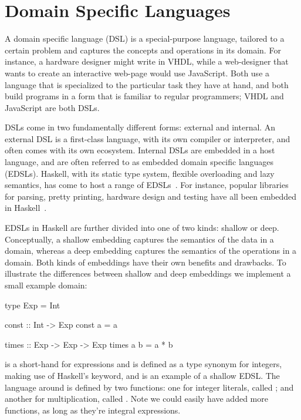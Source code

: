 \documentclass[../paper.tex]{subfiles}
\begin{document}
\section{Domain Specific Languages}
\label{domain}

A domain specific language (DSL) is a special-purpose language, tailored to a certain problem and captures the concepts and operations in its domain. For instance, a hardware designer might write in VHDL, while a web-designer that wants to create an interactive web-page would use JavaScript. Both use a language that is specialized to the particular task they have at hand, and both build programs in a form that is familiar to regular programmers; VHDL and JavaScript are both DSLs.

DSLs come in two fundamentally different forms: external and internal. An external DSL is a first-class language, with its own compiler or interpreter, and often comes with its own ecosystem. Internal DSLs are embedded in a host language, and are often referred to as embedded domain specific languages (EDSLs). Haskell, with its static type system, flexible overloading and lazy semantics, has come to host a range of EDSLs~\cite{elliott2003}. For instance, popular libraries for parsing, pretty printing, hardware design and testing have all been embedded in Haskell~\cite{leijen2002, hughes1995, bjesse1998}.


EDSLs in Haskell are further divided into one of two kinds: shallow or deep. Conceptually, a shallow embedding captures the semantics of the data in a domain, whereas a deep embedding captures the semantics of the operations in a domain. Both kinds of embeddings have their own benefits and drawbacks. To illustrate the differences between shallow and deep embeddings we implement a small example domain:


\begin{code}
type Exp = Int

const :: Int -> Exp
const a = a

times :: Exp -> Exp -> Exp
times a b = a * b
\end{code}

\noindent {} is a short-hand for expressions and is defined as a type synonym for integers, making use of Haskell's  keyword, and is an example of a shallow EDSL. The language around  is defined by two functions: one for integer literals, called ; and another for multiplication, called . Note we could easily have added more functions, as long as they're integral expressions.
\end{document}
